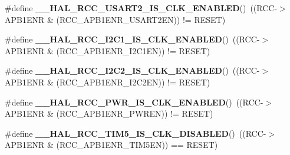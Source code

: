 \begin{DoxyCompactItemize}
\#define {\bfseries \+\_\+\+\_\+\+H\+A\+L\+\_\+\+R\+C\+C\+\_\+\+U\+S\+A\+R\+T2\+\_\+\+I\+S\+\_\+\+C\+L\+K\+\_\+\+E\+N\+A\+B\+L\+ED}()~((R\+CC-\/$>$A\+P\+B1\+E\+NR \& (R\+C\+C\+\_\+\+A\+P\+B1\+E\+N\+R\+\_\+\+U\+S\+A\+R\+T2\+EN)) != R\+E\+S\+ET)
\item 
\mbox{\label{group___r_c_c___a_p_b1___peripheral___clock___enable___disable___status_ga7570e5654fd61b44dabe0546e524c906}} 
\#define {\bfseries \+\_\+\+\_\+\+H\+A\+L\+\_\+\+R\+C\+C\+\_\+\+I2\+C1\+\_\+\+I\+S\+\_\+\+C\+L\+K\+\_\+\+E\+N\+A\+B\+L\+ED}()~((R\+CC-\/$>$A\+P\+B1\+E\+NR \& (R\+C\+C\+\_\+\+A\+P\+B1\+E\+N\+R\+\_\+\+I2\+C1\+EN)) != R\+E\+S\+ET)
\item 
\mbox{\label{group___r_c_c___a_p_b1___peripheral___clock___enable___disable___status_ga2ae540056d72f4230da38c082b6c34c1}} 
\#define {\bfseries \+\_\+\+\_\+\+H\+A\+L\+\_\+\+R\+C\+C\+\_\+\+I2\+C2\+\_\+\+I\+S\+\_\+\+C\+L\+K\+\_\+\+E\+N\+A\+B\+L\+ED}()~((R\+CC-\/$>$A\+P\+B1\+E\+NR \& (R\+C\+C\+\_\+\+A\+P\+B1\+E\+N\+R\+\_\+\+I2\+C2\+EN)) != R\+E\+S\+ET)
\item 
\mbox{\label{group___r_c_c___a_p_b1___peripheral___clock___enable___disable___status_ga850f4fd113303ed7322577ad023cf748}} 
\#define {\bfseries \+\_\+\+\_\+\+H\+A\+L\+\_\+\+R\+C\+C\+\_\+\+P\+W\+R\+\_\+\+I\+S\+\_\+\+C\+L\+K\+\_\+\+E\+N\+A\+B\+L\+ED}()~((R\+CC-\/$>$A\+P\+B1\+E\+NR \& (R\+C\+C\+\_\+\+A\+P\+B1\+E\+N\+R\+\_\+\+P\+W\+R\+EN)) != R\+E\+S\+ET)
\item 
\mbox{\label{group___r_c_c___a_p_b1___peripheral___clock___enable___disable___status_gacbe7ae446991adf3d9d6102549a3faac}} 
\#define {\bfseries \+\_\+\+\_\+\+H\+A\+L\+\_\+\+R\+C\+C\+\_\+\+T\+I\+M5\+\_\+\+I\+S\+\_\+\+C\+L\+K\+\_\+\+D\+I\+S\+A\+B\+L\+ED}()~((R\+CC-\/$>$A\+P\+B1\+E\+NR \& (R\+C\+C\+\_\+\+A\+P\+B1\+E\+N\+R\+\_\+\+T\+I\+M5\+EN)) == R\+E\+S\+ET)
\item 
\mbox{\label{group___r_c_c___a_p_b1___peripheral___clock___enable___disable___status_ga21d4e081c859ddccd4492343743bb245}} 

\end{DoxyCompactItemize}
